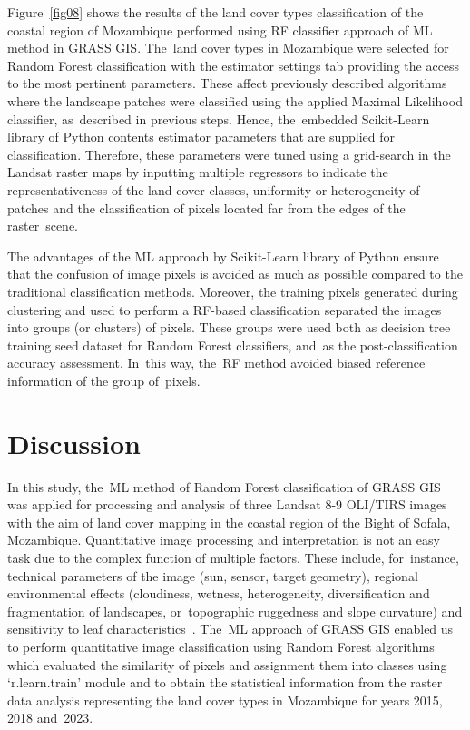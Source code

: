 \documentclass[coasts,article,accept,pdftex,oneauthor]{Definitions/mdpi}
\begin{document}
Figure~\ref{fig08} shows the {results of the land cover types }classification of the coastal region of Mozambique {performed }using RF classifier approach of ML method {in} GRASS GIS. The~land cover types in Mozambique were selected for Random Forest classification with the estimator settings tab providing {the }access to the most pertinent parameters{. These} affect {previously} described algorithms where the landscape patches were classified using {the applied }Maximal Likelihood {classifier, as~described in} previous steps. Hence, the~embedded Scikit-Learn library of Python contents estimator parameters that are supplied for classification. Therefore, these parameters were tuned using a grid-search in the Landsat raster maps by inputting multiple regressors to indicate the representativeness of {the }land cover classes, uniformity or heterogeneity of patches and the classification of pixels located far from the edges of the raster~scene. 

{The} advantages of the ML approach{ }by Scikit-Learn library of Python {ensure that} the {confusion of} image {pixels} is avoided as much as possible compared to the traditional classification methods. Moreover, {the} training pixels generated during clustering and used to perform a RF-based classification separated the images into groups (or clusters) of pixels. These groups were used both as decision tree training seed dataset for Random Forest classifiers, and~as the post-classification accuracy assessment. In~this way, the~RF method avoided biased reference information of the group of~pixels.

\section{Discussion}

In this study, the~ML method of Random Forest classification of GRASS GIS was applied for {processing and analysis of }three Landsat 8-9 OLI/TIRS images {with the aim of }land cover mapping {in} the coastal region of the Bight of Sofala, Mozambique. Quantitative image processing and interpretation is not an easy {task} due to the complex function of {multiple factors. These include, for~instance, }technical parameters of the image (sun, sensor, target geometry), regional environmental effects (cloudiness, wetness, {heterogeneity, }diversification and fragmentation of landscapes, or~topographic ruggedness and slope curvature) and sensitivity to leaf characteristics~\cite{Mitchard}. The~ML approach of GRASS GIS enabled us to perform quantitative image classification using Random Forest algorithms which evaluated the similarity of pixels and assignment them into classes using `r.learn.train' module and to obtain the statistical information from the raster data analysis representing the land cover types in Mozambique for{ }years 2015, 2018 and~2023. 
\end{document}
